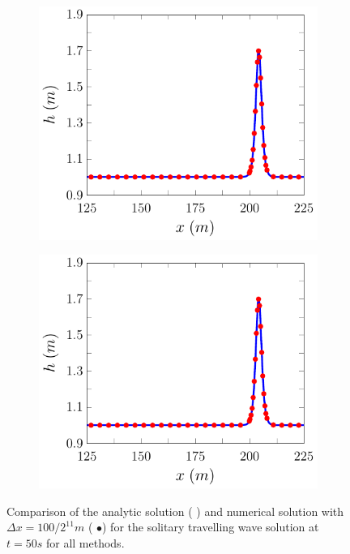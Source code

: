 \begin{figure}
\begin{subfigure}{0.5\textwidth}
		\vspace{0.5cm}
	\end{subfigure}
	\begin{subfigure}{0.5\textwidth}
		\includegraphics[width=\textwidth]{./chp5/figures/Analytic/Soliton/Example/D.pdf}
	\end{subfigure}%
	\begin{subfigure}{0.5\textwidth}
		\includegraphics[width=\textwidth]{./chp5/figures/Analytic/Soliton/Example/W.pdf}
	\end{subfigure}
	\caption{Comparison of the analytic solution ({\color{blue} \solidrule}) and numerical solution with $\Delta x = {100} / {2^{11}}m$ ({\color{red} $\bullet$}) for the solitary travelling wave solution at $t=50s$ for all methods.}
	\label{fig:SolitonExAll}
\end{figure}


